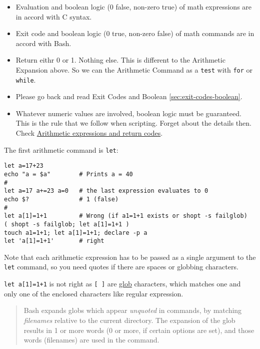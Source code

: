 \begin{itemize}
\item Evaluation and boolean logic (0 false, non-zero true) of
  math expressions are in accord with C syntax.
\item Exit code and boolean logic (0 true, non-zero false) of math
  commands are in accord with Bash.
\item Return eithr 0 or 1. Nothing else. This is different to the
  Arithmetic Expansion above. So we can the Arithmetic Command as
  a \lstinline|test| with \lstinline|for| or \lstinline|while|.
\item Please go back and read Exit Codes and Boolean
  \ref{sec:exit-codes-boolean}.
\item Whatever numeric values are involved, boolean logic must be
  guaranteed. This is the rule that we follow when
  scripting. Forget about the details then. Check
  \href{https://wiki.bash-hackers.org/syntax/arith_expr#arithmetic_expressions_and_return_codes}{Arithmetic
    expressions and return codes}.
\end{itemize}

The first arithmetic command is \lstinline|let|:

\begin{minipage}{1.0\linewidth}
\begin{lstlisting}
let a=17+23
echo "a = $a"        # Prints a = 40
#
let a=17 a+=23 a=0   # the last expression evaluates to 0
echo $?              # 1 (false)
#
let a[1]=1+1         # Wrong (if a1=1+1 exists or shopt -s failglob)
( shopt -s failglob; let a[1]=1+1 )
touch a1=1+1; let a[1]=1+1; declare -p a
let 'a[1]=1+1'       # right
\end{lstlisting}
\end{minipage}

Note that each arithmetic expression has to be passed as a single
argument to the \lstinline|let| command, so you need quotes if
there are spaces or globbing characters.

\lstinline/let a[1]=1+1/ is not right as \lstinline|[ ]| are
\href{http://mywiki.wooledge.org/glob}{glob} characters, which
matches one and only one of the enclosed characters like regular
expression.

\begin{quotation}
  Bash expands globs which appear \textit{unquoted} in commands,
  by matching \textit{filenames} relative to the current
  directory. The expansion of the glob results in 1 or more words
  (0 or more, if certain options are set), and those words
  (filenames) are used in the command.
\end{quotation}

